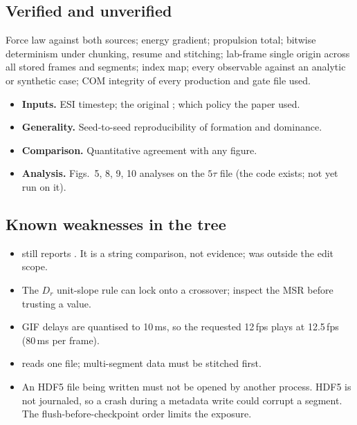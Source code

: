 \subsection{Verified and unverified}
\begin{okbox}[title=Verified]
Force law against both sources; energy gradient; propulsion total; bitwise determinism under chunking, resume and stitching; lab-frame single origin across all stored frames and segments;
index map; every observable against an analytic or synthetic case; COM integrity of every production and gate file used.
\end{okbox}
\begin{warnbox}[title=Unverified or open]
\begin{itemize}
\item \textbf{Inputs.} ESI timestep; the original ; which policy the paper used.
\item \textbf{Generality.} Seed-to-seed reproducibility of formation and dominance.
\item \textbf{Comparison.} Quantitative agreement with any figure.
\item \textbf{Analysis.} Figs.~5, 8, 9, 10 analyses on the $5\tau$ file (the code exists; not yet run on it).
\end{itemize}
\end{warnbox}

\subsection{Known weaknesses in the tree}
\begin{itemize}
\item {} still reports . It is a string comparison, not evidence;  was outside the edit scope.
\item The $D_r$ unit-slope rule can lock onto a crossover; inspect the MSR before trusting a value.
\item GIF delays are quantised to 10\,ms, so the requested 12\,fps plays at 12.5\,fps (80\,ms per frame).
\item {} reads one file; multi-segment data must be stitched first.
\item An HDF5 file being written must not be opened by another process. HDF5 is not journaled, so a crash during a metadata write could corrupt a segment. The flush-before-checkpoint order limits the exposure.
\end{itemize}


